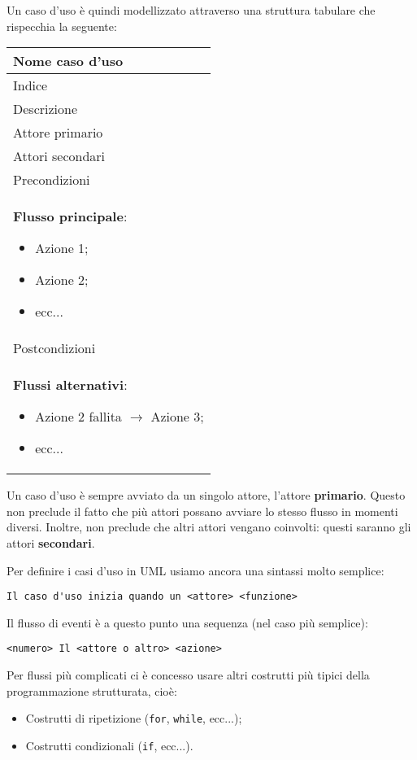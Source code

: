 \documentclass[a4paper,11pt]{article}
\begin{document}
Un caso d'uso è quindi modellizzato attraverso una struttura tabulare che rispecchia la seguente:
\begin{table}[H]
	\center 
	\begin{tabular} { | p{10cm} | }
		\hline
		\bfseries Nome caso d'uso \\ 
		\hline
		Indice \\ 
		\hline
		Descrizione \\ 
		\hline
		Attore primario \\ 
		\hline
		Attori secondari \\ 
		\hline
		Precondizioni \\
		\hline
		\textbf{Flusso principale}:
		\begin{itemize}
			\item Azione 1;
			\item Azione 2;
			\item ecc...
		\end{itemize} \\
		\hline
		Postcondizioni \\ 
		\hline
		\textbf{Flussi alternativi}:
		\begin{itemize}
			\item Azione 2 fallita $\rightarrow$ Azione 3;
			\item ecc...
		\end{itemize} \\
		\hline
	\end{tabular}
\end{table}

Un caso d'uso è sempre avviato da un singolo attore, l'attore \textbf{primario}. Questo non preclude il fatto che più attori possano avviare lo stesso flusso in momenti diversi. Inoltre, non preclude che altri attori vengano coinvolti: questi saranno gli attori \textbf{secondari}.

Per definire i casi d'uso in UML usiamo ancora una sintassi molto semplice:
\begin{lstlisting}[style=codestyle]	
Il caso d'uso inizia quando un <attore> <funzione>
\end{lstlisting}

Il flusso di eventi è a questo punto una sequenza (nel caso più semplice):
\begin{lstlisting}[style=codestyle]	
<numero> Il <attore o altro> <azione>
\end{lstlisting}
Per flussi più complicati ci è concesso usare altri costrutti più tipici della programmazione strutturata, cioè:
\begin{itemize}
	\item Costrutti di ripetizione (\lstinline|for|, \lstinline|while|, ecc...);
	\item Costrutti condizionali (\lstinline|if|, ecc...).
\end{itemize}
\end{document}
